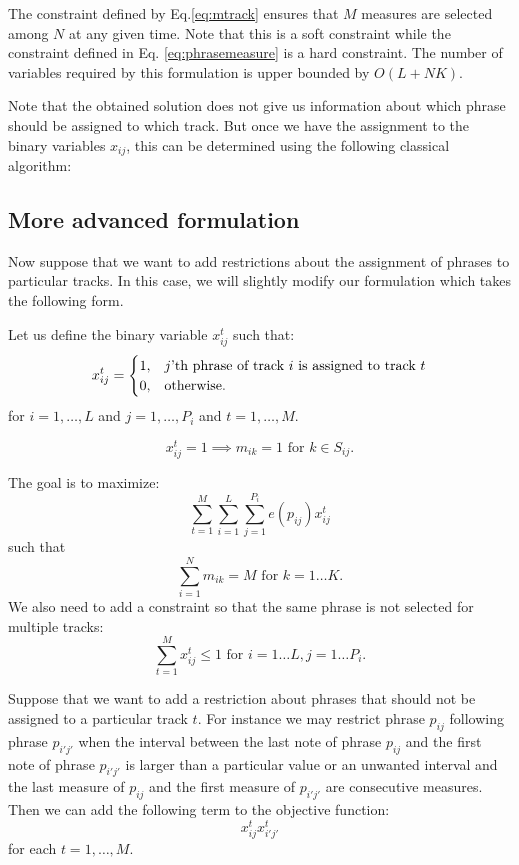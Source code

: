 \documentclass[11pt,a4paper]{article}
\begin{document}
 The constraint defined by Eq.\eqref{eq:mtrack} ensures that $M$ measures are selected among $ N $ at any given time. Note that this is a soft constraint while the constraint defined in Eq. \ref{eq:phrasemeasure} is a hard constraint. The number of variables required by this formulation is upper bounded by $ O(L+NK) $.
 
 Note that the obtained solution does not give us information about which phrase should be assigned to which track. But once we have the assignment to the binary variables $ x_{ij} $, this can be determined using the following classical algorithm:
 
 \subsection{More advanced formulation}
 
 Now suppose that we want to add restrictions about the assignment of phrases to particular tracks. In this case, we will slightly modify our formulation which takes the following form.
 
  Let us define the binary variable $x_{ij}^t$ such that:
 \begin{equation}
 x_{ij}^t =   \begin{cases}%
 1,      & \text{$j$'th phrase of track $i$ is assigned to track $ t $}\\
 0, & \text{otherwise.}
 \end{cases}
 \end{equation}
 for $ i = 1, \dots ,L $ and $ j=1, \dots ,P_i  $ and $ t = 1, \dots, M $.
 
\begin{equation}
 x_{ij}^t = 1 \implies m_{ik}=1 \mbox{ for } k \in S_{ij}.
 \end{equation}

 The goal is to maximize:
 \begin{equation}
 \sum_{t=1}^M \sum_{i=1}^L\sum_{j=1}^{P_i} e(p_{ij})x_{ij}^t
 \end{equation}
 such that
 \begin{equation}
 \sum_{i=1}^N m_{ik} = M \mbox{ for }k=1\dots K. 
 \end{equation} 
 We also need to add a constraint so that the same phrase is not selected for multiple tracks:
  \begin{equation}
 \sum_{t=1}^M x_{ij}^t \leq 1 \mbox{ for }i=1\dots L, j=1 \dots P_i. 
 \end{equation}
 
 Suppose that we want to add a restriction about phrases that should not be assigned to a particular track $ t $. For instance we may restrict phrase $ p_{ij} $ following phrase $ p_{i'j'} $ when the interval between the last note of phrase $ p_{ij} $ and the first note of phrase $p_{i'j'} $ is larger than a particular value or an unwanted interval and the last measure of $ p_{ij} $ and the first measure of $ p_{i'j'} $ are consecutive measures. Then we can add the following term to the objective function:
 \begin{equation}
 x_{ij}^tx_{i'j'}^t
 \end{equation} 
 for each $ t=1,\dots,M $.
 
\end{document}
